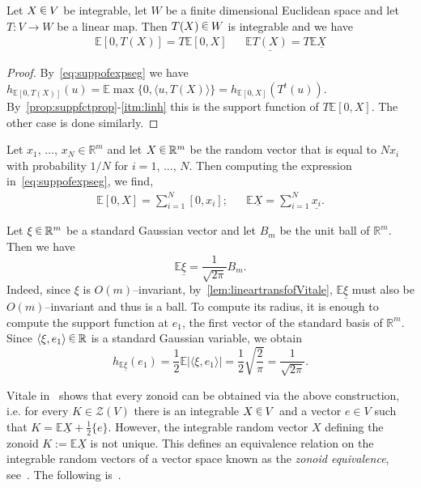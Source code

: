 \documentclass[AHL, Unicode, longabstracts, published]{cedram}
\newcommand{\R}{\mathbb{R}}
\newcommand{\EE}{\mathbb{E}}
\newcommand{\ZZ}{\mathscr{Z}}
\newcommand{\seg}{\underline}
\newcommand*\randin{
\mathchoice {\raisebox{-.35ex}{$\displaystyle{^\subset}$}\mkern-11.5mu\raisebox{+.45ex}{$\displaystyle{_\subset}$}} {\mkern+1mu\raisebox{-.27ex}{$\textstyle{^\subset}$}\mkern-11.7mu\raisebox{+.45ex}{$\textstyle{_\subset}$}} {\raisebox{.35ex}{$\scriptstyle\subset$}\mkern-14mu\raisebox{-.15ex}{$\scriptstyle\subset$}} {\raisebox{.3ex}{$\scriptscriptstyle\subset$}\mkern-13.5mu\raisebox{-.10ex}{$\scriptscriptstyle\subset$}}}
\begin{document}
\begin{lemm}\label{lem:lineartransfofVitale}
Let $X\,\randin\, V$ be integrable, let $W$ be a finite dimensional Euclidean space and let $T:V\to W$ be a linear map. Then $T(X)\,\randin\, W$ is integrable and we have
\begin{align*}
\EE[0,T(X)]=T\EE[0,X] && \EE\seg{T(X)}=T\EE\seg{X}
\end{align*}
\end{lemm}

\begin{proof}
By~\eqref{eq:suppofexpseg} we have $ h_{\EE[0,T(X)]}(u)=\EE\max\{0,\langle u, T(X)\rangle\}=h_{\EE[0,X]}(T^t(u))$. By~\cref{prop:suppfctprop}-\ref{itm:linh} this is the support function of $T\EE[0,X].$ The other case is done similarly.
\end{proof}

\begin{exam}
Let $x_1,\,\ldots,\,x_N\in\R^m$ and let $X\,\randin\, \R^m$ be the random vector that is equal to $Nx_i$ with probability $1/N$ for $i=1,\,\ldots,\,N$. Then computing the expression in~\eqref{eq:suppofexpseg}, we find,
\begin{align*}
\EE[0,X]=\sum_{i=1}^N[0,x_i]; && \EE\seg{X}=\sum_{i=1}^N\seg{x_i}.
\end{align*}
\end{exam}

\begin{exam}\label{eg:gausszonisball}
Let $\xi\,\randin\,\R^m$ be a standard Gaussian vector and let $B_m$ be the unit ball of $\R^m$. Then we have
\begin{equation*}
\EE\seg{\xi}=\frac{1}{\sqrt{2\pi}}B_m.
\end{equation*}
Indeed, since $\xi$ is $O(m)$--invariant, by~\cref{lem:lineartransfofVitale}, $\EE\seg{\xi}$ must also be $O(m)$--invariant and thus is a ball. To compute its radius, it is enough to compute the support function at $e_1$, the first vector of the standard basis of $\R^m$. Since $\langle \xi, e_1\rangle\,\randin\,\R$ is a standard Gaussian variable, we obtain
\begin{equation*}
h_{\EE\seg{\xi}}(e_1)=\frac{1}{2}\EE|\langle \xi, e_1\rangle|=\frac{1}{2}\sqrt{\frac{2}{\pi}}=\frac{1}{\sqrt{2\pi}}.
\end{equation*}
\end{exam}

Vitale in~\cite[Theorem~3.1]{Vitale} shows that every zonoid can be obtained via the above construction, i.e. for every $K\in\ZZ(V)$ there is an integrable $X\,\randin\, V$ and a vector $e\in V$ such that $K=\EE\seg{X}+\tfrac{1}{2}\{e\}$. However, the integrable random vector $X$ defining the zonoid $K:=\EE\seg{X}$ is not unique. This defines an equivalence relation on the integrable random vectors of a vector space known as the \emph{zonoid equivalence}, see~\cite{MSSzoneq}. The following is~\cite[Corollary~3]{MSSzoneq}.
\end{document}
